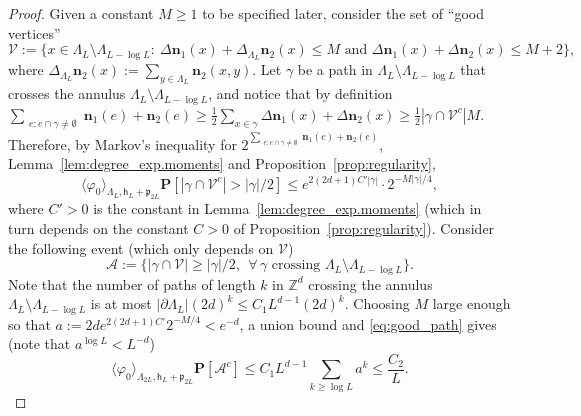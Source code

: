\documentclass[11pt,a4paper]{article}
\theoremstyle{definition}
\numberwithin{equation}{section}
\newcommand\n{\mathbf{n}}
\begin{document}
\begin{proof}
Given a constant $M\geq1$ to be specified later, consider the set of ``good vertices''
$$\mathcal{V}:=\{x\in \Lambda_L\setminus \Lambda_{L-\log L}:~\Delta \n_1(x)+\Delta_{\Lambda_L} \n_2(x)\leq M \text{ and } \Delta \n_1(x)+\Delta \n_2(x)\leq M+2 \},$$
where $\Delta_{\Lambda_L} \n_2(x):=\sum_{y\in \Lambda_L} \n_2(x,y)$. Let $\gamma$ be a path in $\Lambda_L\setminus \Lambda_{L-\log L}$ that crosses the annulus $\Lambda_L\setminus \Lambda_{L-\log L}$, and notice that by definition $\sum_{\substack{e: e \cap \gamma\neq \emptyset}}\n_1(e)+\n_2(e)\geq \frac{1}{2}\sum_{x\in \gamma} \Delta\n_1(x)+\Delta\n_2(x)\geq \frac{1}{2}|\gamma\cap \mathcal{V}^c| M$.
Therefore, by Markov's inequality for $2^{\sum_{\substack{e: e \cap \gamma\neq \emptyset}}\n_1(e)+\n_2(e)}$, Lemma~\ref{lem:degree_exp.moments} and Proposition~\ref{prop:regularity}, 
\begin{equation}\label{eq:good_path}
\langle \varphi_0\rangle_{\Lambda_{L},\mathsf{h}_L+\mathfrak{p}_{2L}}\mathbf{P}[|\gamma\cap\mathcal{V}^c|> |\gamma|/2]\leq e^{2(2d+1)C'|\gamma|} \cdot 2^{-M |\gamma|/4},
\end{equation}
where $C'>0$ is the constant in Lemma~\ref{lem:degree_exp.moments} (which in turn depends on the constant $C>0$ of Proposition~\ref{prop:regularity}). 
Consider the following event (which only depends on $\mathcal{V}$)
$$\mathcal{A}:= \{|\gamma\cap\mathcal{V}| \geq |\gamma|/2, ~~ \forall\, \gamma \text{ crossing } \Lambda_{L}\setminus \Lambda_{L-\log L} \}.$$ 
Note that the number of paths of length $k$ in $\mathbb{Z}^d$ crossing the annulus $\Lambda_L\setminus \Lambda_{L-\log L}$ is at most
$|\partial \Lambda_L|(2d)^k\leq C_1L^{d-1} (2d)^k$.
Choosing $M$ large enough so that $a:=2d e^{2(2d+1)C'}2^{-M/4}<e^{-d}$, a union bound and \eqref{eq:good_path} gives (note that $a^{\log L}< L^{-d}$) 
\begin{equation}\label{eq: high degree points}
\langle \varphi_0\rangle_{\Lambda_{2L},\mathsf{h}_L+\mathfrak{p}_{2L}}\mathbf{P}[\mathcal{A}^c]\leq C_1 L^{d-1}
\sum_{k\geq \log L} a^k\leq \frac{C_2}{L}.
\end{equation}


\end{proof}
\end{document}
